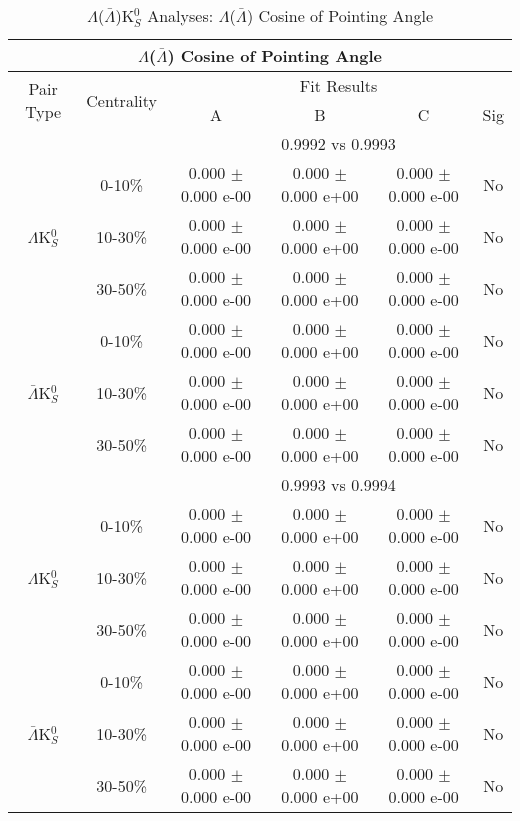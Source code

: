 \documentclass[../AnalysisNoteJBuxton.tex]{subfiles}
\begin{document}
\begin{table}
 \centering
 \begin{tabular}{|c|c|c|c|c|c|}
  \multicolumn{6}{c}{$\Lambda$($\bar{\Lambda}$) Cosine of Pointing Angle} \\
  \hline
  \multirow{2}{*}{Pair Type} & \multirow{2}{*}{Centrality} & \multicolumn{4}{c|}{Fit Results} \\
  \cline{3-6}
   & & A & B & C & Sig \\  
  \hline
  \multicolumn{2}{|c}{} & \multicolumn{4}{c|}{0.9992 vs 0.9993} \\  
  \hline  
  \multirow{3}{*}{$\Lambda$K$^{0}_{S}$}
   &  0-10\% & 0.000 $\pm$ 0.000 e-00 & 0.000 $\pm$ 0.000 e+00 & 0.000 $\pm$ 0.000 e-00 & No \\
   & 10-30\% & 0.000 $\pm$ 0.000 e-00 & 0.000 $\pm$ 0.000 e+00 & 0.000 $\pm$ 0.000 e-00 & No \\
   & 30-50\% & 0.000 $\pm$ 0.000 e-00 & 0.000 $\pm$ 0.000 e+00 & 0.000 $\pm$ 0.000 e-00 & No \\
  \hline
  \multirow{3}{*}{$\bar{\Lambda}$K$^{0}_{S}$}  
   &  0-10\% & 0.000 $\pm$ 0.000 e-00 & 0.000 $\pm$ 0.000 e+00 & 0.000 $\pm$ 0.000 e-00 & No \\
   & 10-30\% & 0.000 $\pm$ 0.000 e-00 & 0.000 $\pm$ 0.000 e+00 & 0.000 $\pm$ 0.000 e-00 & No \\
   & 30-50\% & 0.000 $\pm$ 0.000 e-00 & 0.000 $\pm$ 0.000 e+00 & 0.000 $\pm$ 0.000 e-00 & No \\
  \hline 
  \multicolumn{2}{|c}{} & \multicolumn{4}{c|}{0.9993 vs 0.9994} \\
  \hline  
  \multirow{3}{*}{$\Lambda$K$^{0}_{S}$}   
   &  0-10\% & 0.000 $\pm$ 0.000 e-00 & 0.000 $\pm$ 0.000 e+00 & 0.000 $\pm$ 0.000 e-00 & No \\
   & 10-30\% & 0.000 $\pm$ 0.000 e-00 & 0.000 $\pm$ 0.000 e+00 & 0.000 $\pm$ 0.000 e-00 & No \\
   & 30-50\% & 0.000 $\pm$ 0.000 e-00 & 0.000 $\pm$ 0.000 e+00 & 0.000 $\pm$ 0.000 e-00 & No \\
  \hline  
  \multirow{3}{*}{$\bar{\Lambda}$K$^{0}_{S}$}
   &  0-10\% & 0.000 $\pm$ 0.000 e-00 & 0.000 $\pm$ 0.000 e+00 & 0.000 $\pm$ 0.000 e-00 & No \\
   & 10-30\% & 0.000 $\pm$ 0.000 e-00 & 0.000 $\pm$ 0.000 e+00 & 0.000 $\pm$ 0.000 e-00 & No \\
   & 30-50\% & 0.000 $\pm$ 0.000 e-00 & 0.000 $\pm$ 0.000 e+00 & 0.000 $\pm$ 0.000 e-00 & No \\
  \hline
 \end{tabular}
 \caption{$\Lambda$($\bar{\Lambda}$)K$^{0}_{S}$ Analyses: $\Lambda$($\bar{\Lambda}$) Cosine of Pointing Angle}
 \label{tab:LamCosPointingAngleLamK0Full}
\end{table}
\end{document}
